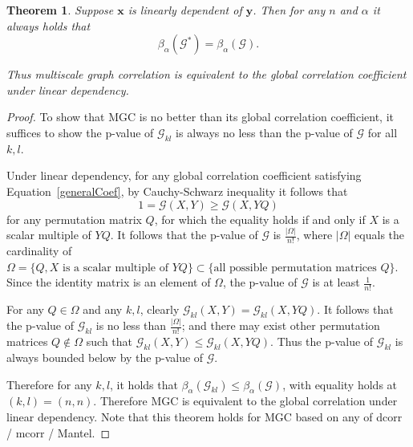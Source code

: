 \documentclass[11pt]{article}
\providecommand{\mb}[1]{\boldsymbol{#1}}
\newcommand{\G}{\mathcal{G}}
\newtheorem{appThm}{Theorem}
\begin{document}
\begin{appThm}
Suppose $\mb{x}$ is linearly dependent of $\mb{y}$. Then for any $n$ and $\alpha$ it always holds that
\begin{equation}
\beta_{\alpha}(\G^{*}) = \beta_{\alpha}(\G).
\end{equation}

Thus multiscale graph correlation is equivalent to the global correlation coefficient under linear dependency.
\end{appThm}
\begin{proof}
To show that MGC is no better than its global correlation coefficient, it suffices to show the p-value of $\G_{kl}$ is always no less than the p-value of $\G$ for all $k,l$.

Under linear dependency, for any global correlation coefficient satisfying Equation~\ref{generalCoef}, by Cauchy-Schwarz inequality it follows that
\begin{equation}
1=\G(X, Y) \geq \G(X, YQ)
\end{equation}
for any permutation matrix $Q$, for which the equality holds if and only if $X$ is a scalar multiple of $YQ$. It follows that the p-value of $\G$ is $\frac{|\Omega|}{n!}$, where $|\Omega|$ equals the cardinality of $\Omega=\{Q, X \mbox{ is a scalar multiple of }YQ\} \subset \{\mbox{all possible permutation matrices }Q\}$. Since the identity matrix is an element of $\Omega$, the p-value of $\G$ is at least $\frac{1}{n!}$.

For any $Q \in \Omega$ and any $k,l$, clearly $\G_{kl}(X,Y)=\G_{kl}(X,YQ)$. It follows that the p-value of $\G_{kl}$ is no less than $\frac{|\Omega|}{n!}$; and there may exist other permutation matrices $Q \notin \Omega$ such that $\G_{kl}(X,Y) \leq \G_{kl}(X,YQ)$. Thus the p-value of $\G_{kl}$ is always bounded below by the p-value of $\G$.

Therefore for any $k,l$, it holds that $\beta_{\alpha}(\G_{kl}) \leq \beta_{\alpha}(\G)$, with equality holds at $(k,l)=(n,n)$. Therefore MGC is equivalent to the global correlation under linear dependency. Note that this theorem holds for MGC based on any of dcorr / mcorr / Mantel.
\end{proof}
\end{document}
